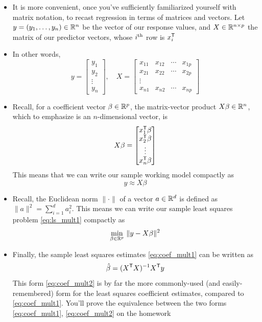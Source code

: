 \documentclass{article}
\begin{document}
\begin{itemize}
\item It is more convenient, once you've sufficiently familiarized yourself with
  matrix notation, to recast regression in terms of matrices and vectors. Let $y 
  = (y_1, \dots, y_n) \in \mathbb{R}^n$ be the vector of our response values, and $X \in
  \mathbb{R}^{n \times p}$ the matrix of our predictor vectors, whose $i^{\textnormal{th}}$ row is
  $x_i^{\mathsf{T}}$    

\item In other words,
  \[
  y = \begin{bmatrix} 
    y_1 \\ y_2 \\ \vdots \\ y_n 
  \end{bmatrix}, \quad 
  X = \begin{bmatrix} 
    x_{11} & x_{12} & \cdots & x_{1p} \\
    x_{21} & x_{22} & \cdots & x_{2p} \\
    \vdots & & & \\
    x_{n1} & x_{n2} & \cdots & x_{np} 
    \end{bmatrix}
  \]

\item Recall, for a coefficient vector $\beta \in \mathbb{R}^p$, the matrix-vector
  product $X \beta \in \mathbb{R}^n$, which to emphasize is an $n$-dimensional vector,
  is    
  \[
  X \beta = 
  \begin{bmatrix} 
    x_1^{\mathsf{T}} \beta \\ x_2^{\mathsf{T}} \beta \\ \vdots \\ x_n^{\mathsf{T}} \beta 
  \end{bmatrix}
  \]
  This means that we can write our sample working model compactly as
  \[
  y \approx X \beta
  \]

\item Recall, the Euclidean norm $\|\cdot\|$ of a vector $a \in \mathbb{R}^d$ is defined
  as $\|a\|^2 = \sum_{i=1}^d a_i^2$. This means we can write our sample least
  squares problem \eqref{eq:ls_mult1} compactly as 
  \begin{equation}
  \label{eq:ls_mult2}
  \min_{\beta \in \mathbb{R}^p} \, \|y - X \beta\|^2
  \end{equation}

\item Finally, the sample least squares estimates \eqref{eq:coef_mult1} can 
  be written as 
  \begin{equation}
  \label{eq:coef_mult2}
  \hat{\beta} = (X^{\mathsf{T}} X)^{-1} X^{\mathsf{T}} y  
  \end{equation}
  This form \eqref{eq:coef_mult2} is by far the more commonly-used (and
  easily-remembered) form for the least squares coefficient estimates, compared
  to \eqref{eq:coef_mult1}. You'll prove the equivalence between the two
  forms \eqref{eq:coef_mult1}, \eqref{eq:coef_mult2} on the homework 


\end{itemize}
\end{document}
